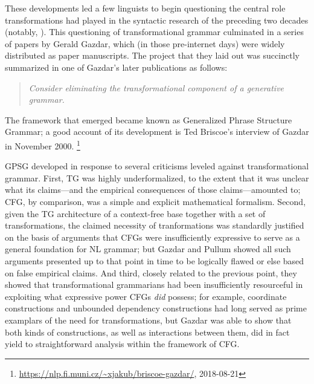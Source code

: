 \documentclass[output=paper]{langsci/langscibook}
\begin{document}
These developments led a few linguists to begin questioning the central role transformations had played in the syntactic research of the preceding two decades (notably, \citet{Bresnan78a}).  This questioning of transformational grammar culminated in a series of papers by Gerald Gazdar, which (in those pre-internet days) were widely distributed as paper manuscripts.  The project that they laid out was succinctly summarized in one of Gazdar's later publications \citep{Gazdar81} as follows:

\begin{quote}
{\em Consider eliminating the transformational component of a generative grammar.}
\end{quote}

\noindent
The framework that emerged became known as Generalized Phrase Structure Grammar; a good account of
its development is Ted Briscoe's interview of Gazdar in November
2000. \footnote{\url{https://nlp.fi.muni.cz/~xjakub/briscoe-gazdar/}, 2018-08-21}

GPSG developed in response to several criticisms leveled against transformational grammar. First, TG was highly underformalized, to the extent that it was unclear what its claims---and the empirical consequences of those claims---amounted to; CFG, by comparison, was a simple and explicit mathematical formalism. Second, given the TG architecture of a context-free base together with a set of transformations, the claimed necessity of tranformations was standardly justified on the basis of arguments that CFGs were insufficiently expressive to serve as a general foundation for NL grammar; but Gazdar and Pullum showed all such arguments presented up to that point in time to be logically flawed or else based on false empirical claims. And third, closely related to the previous point, they showed that transformational grammarians had been insufficiently resourceful in exploiting what expressive power CFGs {\em did} possess; for example, coordinate constructions and unbounded dependency constructions had long served as prime examplars of the need for transformations, but Gazdar was able to show that both kinds of constructions, as well as interactions between them, did in fact yield to straightforward analysis within the framework of CFG.
 
\end{document}
